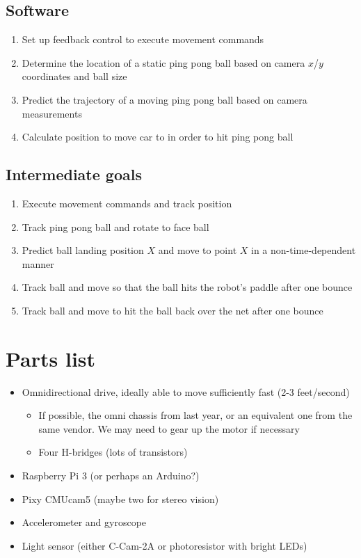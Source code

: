 \documentclass[letterpaper, 11pt]{article}
\begin{document}
\subsection*{Software}
\begin{enumerate}[label=\textbf{(\arabic*)}]
    \item Set up feedback control to execute movement commands
    \item Determine the location of a static ping pong ball based on camera $x$/$y$ coordinates and ball size
    \item Predict the trajectory of a moving ping pong ball based on camera measurements
    \item Calculate position to move car to in order to hit ping pong ball
\end{enumerate}

\subsection*{Intermediate goals}
\begin{enumerate}[label=\textbf{(\arabic*)}]
    \item Execute movement commands and track position
    \item Track ping pong ball and rotate to face ball
    \item Predict ball landing position $X$ and move to point $X$ in a non-time-dependent manner
    \item Track ball and move so that the ball hits the robot's paddle after one bounce
    \item Track ball and move to hit the ball back over the net after one bounce
\end{enumerate}

\section{Parts list}
\begin{itemize}
    \item Omnidirectional drive, ideally able to move sufficiently fast (2-3 feet/second)
        \begin{itemize}
            \item If possible, the omni chassis from last year, or an equivalent one from the same vendor. We may need to gear up the motor if necessary
            \item Four H-bridges (lots of transistors)
        \end{itemize}
    \item Raspberry Pi 3 (or perhaps an Arduino?)
    \item Pixy CMUcam5 (maybe two for stereo vision)
    \item Accelerometer and gyroscope
    \item Light sensor (either C-Cam-2A or photoresistor with bright LEDs)
\end{itemize}
\end{document}
